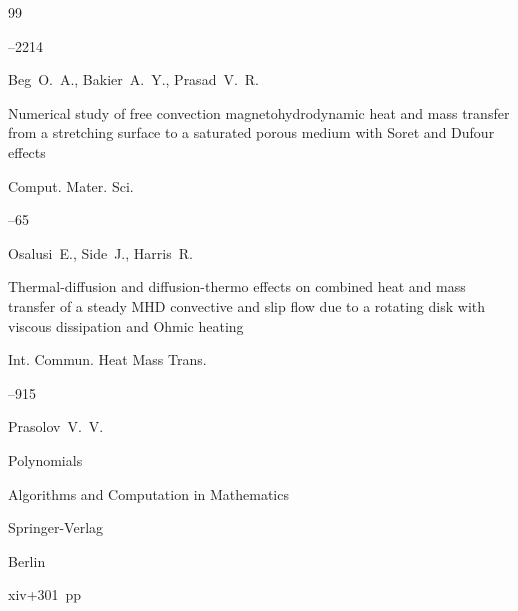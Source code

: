 \begin{thebibliography}{99}



--2214






\by Beg~O.~A., Bakier~A.~Y., Prasad~V.~R.

\paper Numerical study of free convection magnetohydrodynamic heat and mass transfer from a stretching surface to a saturated porous medium with Soret and Dufour effects

\jour Comput. Mater. Sci.




--65






\by Osalusi~E., Side~J., Harris~R.

\paper Thermal-diffusion and diffusion-thermo effects on combined heat and mass transfer of a steady MHD convective and slip flow due to a rotating disk with viscous dissipation and Ohmic heating

\jour Int. Commun. Heat  Mass Trans.




--915






\by Prasolov~V.~V. 

\book Polynomials

\serial Algorithms and Computation in Mathematics


\publ Springer-Verlag

\publaddr Berlin


\totalpages xiv+301~pp \nofrills




\end{thebibliography}





